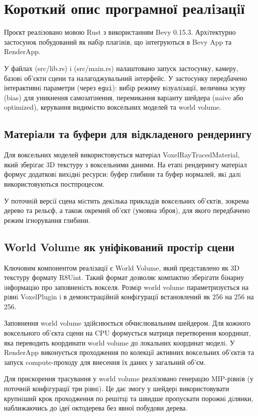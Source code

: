 \documentclass[a4paper,12pt]{article}
\begin{document}
\section*{Короткий опис програмної реалiзацiї}
Проєкт реалiзовано мовою Rust з використанням Bevy 0.15.3. Архiтектурно застосунок побудований як набiр плагiнiв, що iнтегруються в Bevy App та RenderApp.

У файлах (src/lib.rs) i (src/main.rs) налаштовано запуск застосунку, камеру, базовi об’єкти сцени та налагоджувальний iнтерфейс. У застосунку передбачено інтерактивнi параметри (через \texttt{egui}): вибiр режиму вiзуалiзацiї, величина зсуву (bias) для уникнення самозатiнення, перемикання варiанту шейдера (naive або optimized), керування видимiстю воксельних моделей та world volume.

\subsection*{Матерiали та буфери для вiдкладеного рендерингу}
Для воксельних моделей використовується матерiал VoxelRayTracedMaterial, який зберiгає 3D текстуру з воксельними даними. На етапi рендерингу матерiал формує додатковi вихiднi ресурси: буфер глибини та буфер нормалей, якi далi використовуються постпроцесом.

У поточнiй версiї сцена мiстить декiлька прикладiв воксельних об’єктiв, зокрема дерево та рельєф, а також окремий об’єкт (умовна зброя), для якого передбачено режим ігнорування глибини.

\subsection*{World Volume як уніфікований простiр сцени}
Ключовим компонентом реалiзацiї є World Volume, який представлено як 3D текстуру формату R8Uint. Такий формат дозволяє компактно зберiгати бiнарну iнформацiю про заповненiсть вокселя. Розмiр world volume параметризується на рiвнi VoxelPlugin i в демонстрацiйнiй конфiгурацiї встановлений як 256 на 256 на 256.

Заповнення world volume здiйснюється обчислювальним шейдером. Для кожного воксельного об’єкта сцени на CPU формується матриця перетворення координат, яка переводить координати world volume до локальних координат моделi. У RenderApp виконується проходження по колекцiї активних воксельних об’єктiв та запуск compute-проходу для внесення їх даних у загальний об’єм.

Для прискорення трасування у world volume реалiзовано генерацiю MIP-рiвнiв (у поточнiй конфiгурацiї три рiвнi). Це дає змогу у шейдерi використовувати крупнiший крок проходження по решiтцi та швидше пропускати порожнi дiлянки, наближаючись до iдеї октодерева без явної побудови дерева.
\end{document}
